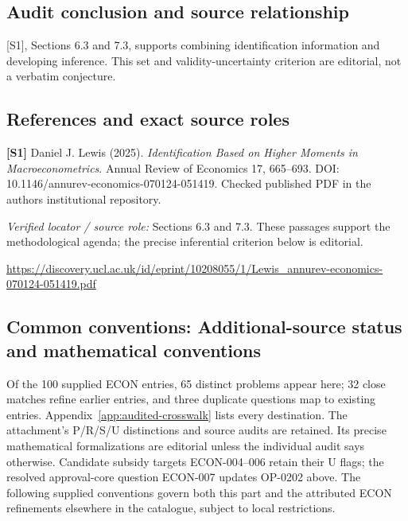 \documentclass[11pt,a4paper]{article}
\begin{document}
\subsection*{Audit conclusion and source relationship}

[S1], Sections 6.3 and 7.3, supports combining identification information and developing inference. This set and validity-uncertainty criterion are editorial, not a verbatim conjecture.

\subsection*{References and exact source roles}

{\footnotesize\raggedright
\par\noindent\textbf{[S1]} Daniel J. Lewis (2025). \emph{Identification Based on Higher Moments in Macroeconometrics}. Annual Review of Economics 17, 665--693. DOI: 10.1146/annurev-economics-070124-051419. Checked published PDF in the author\textquotesingle s institutional repository.\par \textit{Verified locator / source role:} Sections 6.3 and 7.3. These passages support the methodological agenda; the precise inferential criterion below is editorial.\par \url{https://discovery.ucl.ac.uk/id/eprint/10208055/1/Lewis_annurev-economics-070124-051419.pdf}\par\smallskip
}

\subsection*{Common conventions: Additional-source status and mathematical conventions}

\label{audited:conventions}

Of the 100 supplied ECON entries, 65 distinct problems appear here; 32 close
matches refine earlier entries, and three duplicate questions map to existing
entries. Appendix~\ref{app:audited-crosswalk} lists every destination.
The attachment's P/R/S/U distinctions and source audits are retained. Its
precise mathematical formalizations are editorial unless the individual audit
says otherwise. Candidate subsidy targets ECON-004--006 retain their U flags;
the resolved approval-core question ECON-007 updates OP-0202 above.
The following supplied conventions govern both this part and the attributed
ECON refinements elsewhere in the catalogue, subject to local restrictions.
\end{document}
